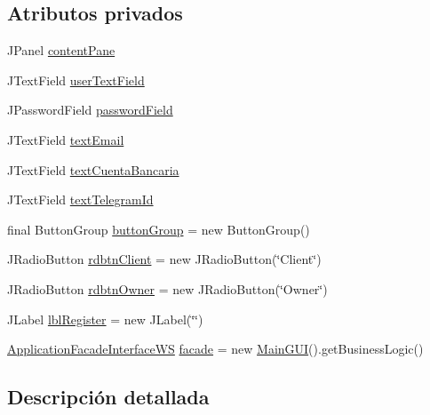 \subsection*{Atributos privados}
\begin{DoxyCompactItemize}
\item 
J\+Panel \mbox{\hyperlink{classgui_1_1_sign_in_a0661fb8f7c58f5389415b3c24c3385bd}{content\+Pane}}
\item 
J\+Text\+Field \mbox{\hyperlink{classgui_1_1_sign_in_aff14593606bb17dcdf89b2f2a6699f43}{user\+Text\+Field}}
\item 
J\+Password\+Field \mbox{\hyperlink{classgui_1_1_sign_in_a3334294c202619a0e673c162f0d5b280}{password\+Field}}
\item 
J\+Text\+Field \mbox{\hyperlink{classgui_1_1_sign_in_a4aa7ecbf60495c3f44fba7979783990a}{text\+Email}}
\item 
J\+Text\+Field \mbox{\hyperlink{classgui_1_1_sign_in_a8a864d56fe9adba78e852b99fabf7e57}{text\+Cuenta\+Bancaria}}
\item 
J\+Text\+Field \mbox{\hyperlink{classgui_1_1_sign_in_a9162a721d6af763ff401522b6749cd88}{text\+Telegram\+Id}}
\item 
final Button\+Group \mbox{\hyperlink{classgui_1_1_sign_in_afbdae1f60f065dd2b577301caa6926c0}{button\+Group}} = new Button\+Group()
\item 
J\+Radio\+Button \mbox{\hyperlink{classgui_1_1_sign_in_acf11e0c6e73a74d0b4bcd5cc84a64f2a}{rdbtn\+Client}} = new J\+Radio\+Button(\char`\"{}Client\char`\"{})
\item 
J\+Radio\+Button \mbox{\hyperlink{classgui_1_1_sign_in_a4b8b426bb66155e4c5ff3fc71d6fab73}{rdbtn\+Owner}} = new J\+Radio\+Button(\char`\"{}Owner\char`\"{})
\item 
J\+Label \mbox{\hyperlink{classgui_1_1_sign_in_a91128d3298a69d4306a3435d9f5002c6}{lbl\+Register}} = new J\+Label(\char`\"{}\char`\"{})
\item 
\mbox{\hyperlink{interfacebusiness_logic_1_1_application_facade_interface_w_s}{Application\+Facade\+Interface\+WS}} \mbox{\hyperlink{classgui_1_1_sign_in_a1333e1c41f2354e4bab8acdeeafef7b0}{facade}} = new \mbox{\hyperlink{classgui_1_1_main_g_u_i}{Main\+G\+UI}}().get\+Business\+Logic()
\end{DoxyCompactItemize}


\subsection{Descripción detallada}


